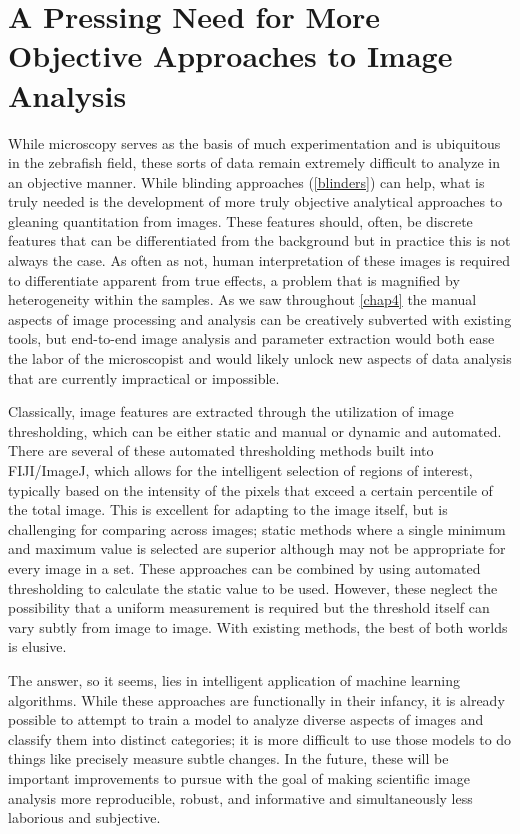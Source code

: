 \section{A Pressing Need for More Objective Approaches to Image Analysis}\label{newimaging}

While microscopy serves as the basis of much experimentation and is ubiquitous in the zebrafish field, these sorts of data remain extremely difficult to analyze in an objective manner. While blinding approaches (\autoref{blinders}) can help, what is truly needed is the development of more truly objective analytical approaches to gleaning quantitation from images. These features should, often, be discrete features that can be differentiated from the background but in practice this is not always the case. As often as not, human interpretation of these images is required to differentiate apparent from true effects, a problem that is magnified by heterogeneity within the samples. As we saw throughout \autoref{chap4} the manual aspects of image processing and analysis can be creatively subverted with existing tools, but end\hyp{}to\hyp{}end image analysis and parameter extraction would both ease the labor of the microscopist and would likely unlock new aspects of data analysis that are currently impractical or impossible.

Classically, image features are extracted through the utilization of image thresholding, which can be either static and manual or dynamic and automated. There are several of these automated thresholding methods built into FIJI/ImageJ, which allows for the intelligent selection of regions of interest, typically based on the intensity of the pixels that exceed a certain percentile of the total image. This is excellent for adapting to the image itself, but is challenging for comparing across images; static methods where a single minimum and maximum value is selected are superior although may not be appropriate for every image in a set. These approaches can be combined by using automated thresholding to calculate the static value to be used. However, these neglect the possibility that a uniform measurement is required but the threshold itself can vary subtly from image to image. With existing methods, the best of both worlds is elusive.

The answer, so it seems, lies in intelligent application of machine learning algorithms. While these approaches are functionally in their infancy, it is already possible to attempt to train a model to analyze diverse aspects of images and classify them into distinct categories; it is more difficult to use those models to do things like precisely measure subtle changes. In the future, these will be important improvements to pursue with the goal of making scientific image analysis more reproducible, robust, and informative and simultaneously less laborious and subjective.

